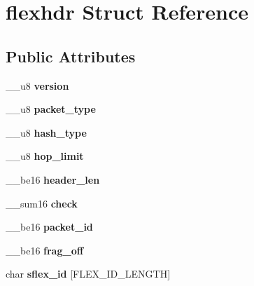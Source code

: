 \hypertarget{structflexhdr}{}\section{flexhdr Struct Reference}
\label{structflexhdr}
\subsection*{Public Attributes}
\begin{DoxyCompactItemize}
\item 
\+\_\+\+\_\+u8 {\bfseries version}\hypertarget{structflexhdr_a58658c0c3ac88c2ae21cf52cdbeaefd0}{}\label{structflexhdr_a58658c0c3ac88c2ae21cf52cdbeaefd0}

\item 
\+\_\+\+\_\+u8 {\bfseries packet\+\_\+type}\hypertarget{structflexhdr_a3e17e4077f496e9eed85b5705a40b06f}{}\label{structflexhdr_a3e17e4077f496e9eed85b5705a40b06f}

\item 
\+\_\+\+\_\+u8 {\bfseries hash\+\_\+type}\hypertarget{structflexhdr_aa2a7292e9ff348680f83067955b58d0f}{}\label{structflexhdr_aa2a7292e9ff348680f83067955b58d0f}

\item 
\+\_\+\+\_\+u8 {\bfseries hop\+\_\+limit}\hypertarget{structflexhdr_a550e9254701dcd7665cdc1d52f9599fa}{}\label{structflexhdr_a550e9254701dcd7665cdc1d52f9599fa}

\item 
\+\_\+\+\_\+be16 {\bfseries header\+\_\+len}\hypertarget{structflexhdr_a7a2903458e61241565c61177a87c6dbb}{}\label{structflexhdr_a7a2903458e61241565c61177a87c6dbb}

\item 
\+\_\+\+\_\+sum16 {\bfseries check}\hypertarget{structflexhdr_a7e2d0c232c92ea39204ec52563cbd33e}{}\label{structflexhdr_a7e2d0c232c92ea39204ec52563cbd33e}

\item 
\+\_\+\+\_\+be16 {\bfseries packet\+\_\+id}\hypertarget{structflexhdr_a15281b3aa64868e176dffbb7ee5f2acc}{}\label{structflexhdr_a15281b3aa64868e176dffbb7ee5f2acc}

\item 
\+\_\+\+\_\+be16 {\bfseries frag\+\_\+off}\hypertarget{structflexhdr_a85f045e7acaf63edb2cd192266ef49bf}{}\label{structflexhdr_a85f045e7acaf63edb2cd192266ef49bf}

\item 
char {\bfseries sflex\+\_\+id} \mbox{[}F\+L\+E\+X\+\_\+\+I\+D\+\_\+\+L\+E\+N\+G\+TH\mbox{]}\hypertarget{structflexhdr_a3d0b687dac926a77cde8a5cc01f05533}{}\label{structflexhdr_a3d0b687dac926a77cde8a5cc01f05533}


\end{DoxyCompactItemize}
